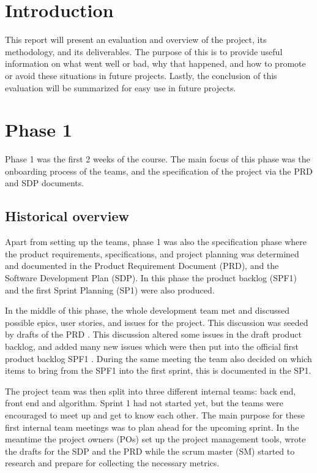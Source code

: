 \documentclass{article}
\begin{document}
\section{Introduction}
This report will present an evaluation and overview of the project, its methodology, and its deliverables. The purpose of this is to provide useful information on what went well or bad, why that happened, and how to promote or avoid these situations in future projects. Lastly, the conclusion of this evaluation will be summarized for easy use in future projects.

\section{Phase 1}
Phase 1 was the first 2 weeks of the course. The main focus of this phase was the onboarding process of the teams, and the specification of the project via the PRD\cite{PRD} and SDP documents\cite{SDP}. 
\subsection{Historical overview}

Apart from setting up the teams, phase 1 was also the specification phase where the product requirements, specifications, and project planning was determined and documented in the Product Requirement Document (PRD)\cite{PRD}, and the Software Development Plan (SDP)\cite{SDP}. In this phase the product backlog (SPF1)\cite{SPF1} and the first Sprint Planning (SP1)\cite{SP1} were also produced. 

In the middle of this phase, the whole development team met and discussed possible epics, user stories, and issues for the project. This discussion was seeded by drafts of the PRD \cite{PRD}. This discussion altered some issues in the draft product backlog, and added many new issues which were then put into the official first product backlog SPF1 \cite{SPF1}. During the same meeting the team also decided on which items to bring from the SPF1 into the first sprint, this is documented in the SP1\cite{SP1}. 

The project team was then split into three different internal teams: back end, front end and algorithm. Sprint 1 had not started yet, but the teams were encouraged to meet up and get to know each other. The main purpose for these first internal team meetings was to plan ahead for the upcoming sprint. In the meantime the project owners (POs) set up the project management tools, wrote the drafts for the SDP and the PRD while the scrum master (SM) started to research and prepare for collecting the necessary metrics.
\end{document}
